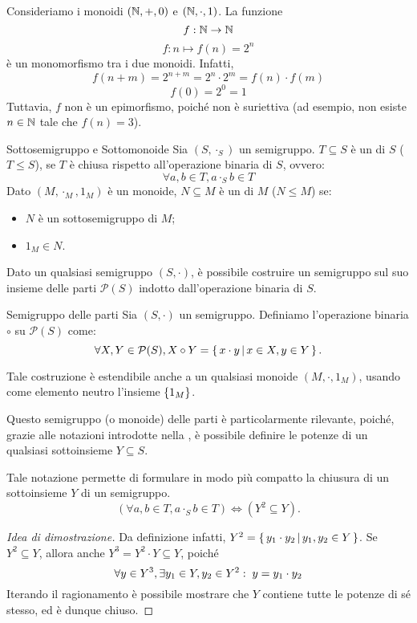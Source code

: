 \begin{example}{}
  Consideriamo i monoidi \((\mathbb{N}, +, 0)\) e \((\mathbb{N}, \cdot, 1)\).
  La funzione 
  \[f: \mathbb{N} \to \mathbb{N}\]
  \[f:n \mapsto f(n) = 2^n\]
  è un monomorfismo tra i due monoidi.
  Infatti,
  \[f(n+m) = 2^{n+m} = 2^n \cdot 2^m = f(n) \cdot f(m)\]
  \[ f(0) = 2^0 = 1\]
  Tuttavia, \(f\) non è un epimorfismo, poiché non è suriettiva (ad esempio, non esiste \(n \in \mathbb{N}\) tale che \(f(n) = 3\)).
\end{example}

\begin{definition}{Sottosemigruppo e Sottomonoide}
  Sia \((S,\cdot_S)\) un semigruppo.
  \(T \subseteq S\) è un  di \(S\) (\(T \leq S\)), se \(T\) è chiusa rispetto all'operazione binaria di \(S\), ovvero:
  \[\forall a,b \in T, a \cdot_S b \in T\]
  Dato \((M,\cdot_M,1_M)\) è un monoide, \(N \subseteq M\) è un  di \(M\) (\(N \leq M\)) se:
  \begin{itemize}
    \item \(N\) è un sottosemigruppo di \(M\);
    \item \(1_M \in N\).
  \end{itemize}
\end{definition}

Dato un qualsiasi semigruppo \((S,\cdot)\), è possibile costruire un semigruppo sul suo insieme delle parti \(\mathcal{P}(S)\) indotto dall'operazione binaria di \(S\).
\begin{definition}{Semigruppo delle parti}
  Sia \((S,\cdot)\) un semigruppo.
  Definiamo l'operazione binaria \(\circ\) su \(\mathcal{P}(S)\) come:
  \[\forall X,Y \in \mathcal{P}(S), X \circ Y = \set{x \cdot y}[ x \in X, y \in Y].\]
\end{definition}
Tale costruzione è estendibile anche a un qualsiasi monoide \((M,\cdot,1_M)\), usando come elemento neutro l'insieme \(\set{1_M}\).

Questo semigruppo (o monoide) delle parti è particolarmente rilevante, poiché, grazie alle notazioni introdotte nella , è possibile definire le potenze di un qualsiasi sottoinsieme \(Y \subseteq S\).

Tale notazione permette di formulare in modo più compatto la chiusura di un sottoinsieme \(Y\) di un semigruppo.
  \[(\forall a,b \in T, a \cdot_S b \in T)\iff (Y^2 \subseteq Y).\]
\begin{proof}[Idea di dimostrazione]\label{proof:alt_notation_closure}
  Da definizione infatti, \(Y^2 = \set{y_1 \cdot y_2}[y_1,y_2 \in Y]\). Se \(Y^2 \subseteq Y\), allora anche \(Y^3 = Y^2 \cdot Y \subseteq Y\), poiché
  \[\forall y \in Y^3, \exists y_1 \in Y, y_2 \in Y^2:\; y = y_1 \cdot y_2\]
  Iterando il ragionamento è possibile mostrare che \(Y\) contiene tutte le potenze di sé stesso, ed è dunque chiuso.
\end{proof}

